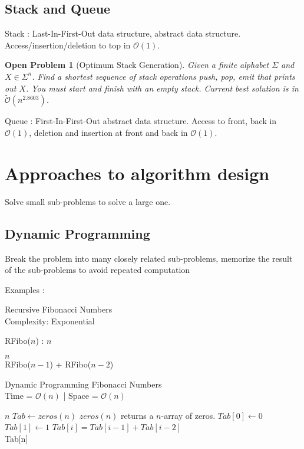 \documentclass[12pt]{cours}
\newtheorem{openpb}{Open Problem}
\begin{document}
\subsection{Stack and Queue}
Stack : Last-In-First-Out data structure, abstract data structure. Access/insertion/deletion to top in $\mathcal{O}(1)$.

\begin{openpb}[Optimum Stack Generation]
    Given a finite alphabet $\Sigma$ and $X \in \Sigma^{n}$. Find a shortest sequence of stack operations push, pop, emit that prints out $X$. You must start and finish with an empty stack.
    Current best solution is in $\tilde{\mathcal{O}}(n^{2.8603})$.
\end{openpb}

Queue : First-In-First-Out abstract data structure. Access to front, back in $\mathcal{O}(1)$, deletion and insertion at front and back in $\mathcal{O}(1)$.

\section{Approaches to algorithm design}
Solve small sub-problems to solve a large one.

\subsection{Dynamic Programming}
Break the problem into many closely related sub-problems, memorize the result of the sub-problems to avoid repeated computation

Examples :
\begin{algorithm}
    \caption{Recursive Fibonacci Numbers \\ Complexity: Exponential}
    \begin{algorithmic}
        \State RFibo($n$) :
        \Input
        $ n$
        \EndInput

        \Return $n$
        \EndIf\\
        \Return RFibo($n-1$) + RFibo($n-2$)
    \end{algorithmic}
\end{algorithm}

\begin{algorithm}
    \caption{Dynamic Programming Fibonacci Numbers \\ Time = $\mathcal{O}(n)$ | Space = $\mathcal{O}(n)$}
    \begin{algorithmic}
        \Input
        $ n$
        \EndInput
        \State $Tab \gets zeros(n)$ \Comment $zeros(n)$ returns a $n$-array of zeros.
        \State $Tab[0] \gets 0$
        \State $Tab[1] \gets 1$
        \State $Tab[i] = Tab[i-1] + Tab[i-2]$
        \EndFor\\
        \Return Tab[n]
    \end{algorithmic}
\end{algorithm}
\end{document}
